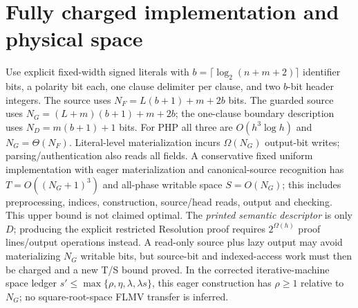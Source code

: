 \documentclass[11pt]{article}
\begin{document}
\section*{Fully charged implementation and physical space}
Use explicit fixed-width signed literals with $b=\lceil\log_2(n+m+2)\rceil$ identifier bits, a polarity bit each, one clause delimiter per clause, and two $b$-bit header integers. The source uses $N_F=L(b+1)+m+2b$ bits. The guarded source uses
$N_G=(L+m)(b+1)+m+2b$; the one-clause boundary description uses $N_D=m(b+1)+1$ bits. For PHP all three are $O(h^3\log h)$ and $N_G=\Theta(N_F)$. Literal-level materialization incurs $\Omega(N_G)$ output-bit writes; parsing/authentication also reads all fields. A conservative fixed uniform implementation with eager materialization and canonical-source recognition has $T=O((N_G+1)^3)$ and all-phase writable space $S=O(N_G)$; this includes preprocessing, indices, construction, source/head reads, output and checking. This upper bound is not claimed optimal. The \emph{printed semantic descriptor} is only $D$; producing the explicit restricted Resolution proof requires $2^{\Omega(h)}$ proof lines/output operations instead. A read-only source plus lazy output may avoid materializing $N_G$ writable bits, but source-bit and indexed-access work must then be charged and a new T/S bound proved. In the corrected iterative-machine space ledger $s'\le\max\{\rho,\eta,\lambda,\lambda s\}$, this eager construction has $\rho\ge 1$ relative to $N_G$; no square-root-space FLMV transfer is inferred.
\end{document}
